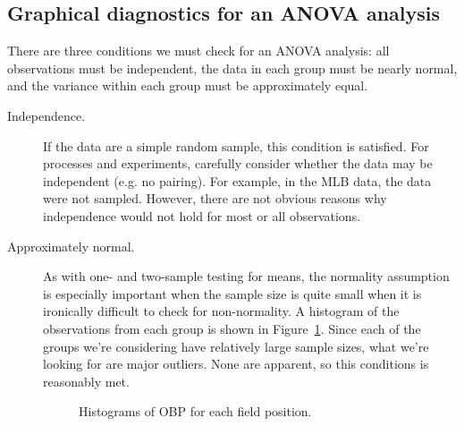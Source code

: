 \subsection{Graphical diagnostics for an ANOVA analysis}

There are three conditions we must check for an ANOVA analysis: all observations must be independent, the data in each group must be nearly normal, and the variance within each group must be approximately equal.

\begin{description}
\item[Independence.]
    If the data are a simple random sample,
    this condition is satisfied.
    For processes and experiments, carefully consider whether
    the data may be independent (e.g. no pairing).
    For example, in the MLB data, the data were not sampled.
    However, there are not obvious reasons why independence
    would not hold for most or all observations.
\item[Approximately normal.]
    As with one- and two-sample testing for means,
    the normality assumption is especially important
    when the sample size is quite small when it is
    ironically difficult to check for non-normality.
    A histogram of the observations from each group
    is shown in Figure~\ref{mlbANOVADiagNormalityGroups}.
    Since each of the groups we're considering have
    relatively large sample sizes,
    what we're looking for are major outliers.
    None are apparent, so this conditions is reasonably met.

\begin{figure}[h]
  \centering
  \caption{Histograms of OBP for each field position.}
  \label{mlbANOVADiagNormalityGroups}
\end{figure}


\end{description}
